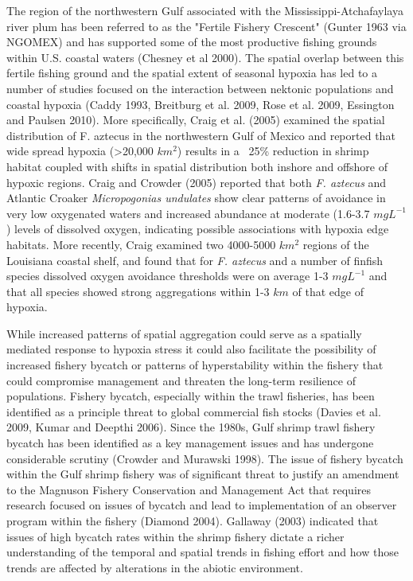 \documentclass[10pt]{article}
\begin{document}
The region of the northwestern Gulf associated with the Mississippi-Atchafaylaya river plum has been referred to as the "Fertile Fishery Crescent" (Gunter 1963 via NGOMEX) and has supported some of the most productive fishing grounds within U.S. coastal waters (Chesney et al 2000).  The spatial overlap between this fertile fishing ground and the spatial extent of seasonal hypoxia has led to a number of studies focused on the interaction between nektonic populations and coastal hypoxia (Caddy 1993, Breitburg et al. 2009, Rose et al. 2009, Essington and Paulsen 2010).  More specifically, Craig et al. (2005) examined the spatial distribution of F. aztecus in the northwestern Gulf of Mexico and reported that wide spread hypoxia (\textgreater 20,000 $ km^{2} $) results in a ~25\% reduction in shrimp habitat coupled with shifts in spatial distribution both inshore and offshore of hypoxic regions.  Craig and Crowder (2005) reported that both \textit{F. aztecus} and Atlantic Croaker \textit{Micropogonias undulates} show clear patterns of avoidance in very low oxygenated waters and increased abundance at moderate (1.6-3.7 $ mg{} L^{-1} $) levels of dissolved oxygen, indicating possible associations with hypoxia edge habitats.  More recently, Craig \cite{craig_aggregation_2012} examined two 4000-5000 $ km^{2} $ regions of the Louisiana coastal shelf, and found that for \textit{F. aztecus} and a number of finfish species dissolved oxygen avoidance thresholds were on average 1-3 $ mg{} L^{-1} $ and that all species showed strong aggregations within 1-3 $ km $ of that edge of hypoxia.  

While increased patterns of spatial aggregation could serve as a spatially mediated response to hypoxia stress it could also facilitate the possibility of increased fishery bycatch or patterns of hyperstability within the fishery that could compromise management and threaten the long-term resilience of populations.  Fishery bycatch, especially within the trawl fisheries, has been identified as a principle threat to global commercial fish stocks (Davies et al. 2009, Kumar and Deepthi 2006).  Since the 1980s, Gulf shrimp trawl fishery bycatch has been identified as a key management issues and has undergone considerable scrutiny (Crowder and Murawski 1998).  The issue of fishery bycatch within the Gulf shrimp fishery was of significant threat to justify an amendment to the Magnuson Fishery Conservation and Management Act that requires research focused on issues of bycatch and lead to implementation of an observer program within the fishery (Diamond 2004).  Gallaway (2003) indicated that issues of high bycatch rates within the shrimp fishery dictate a richer understanding of the temporal and spatial trends in fishing effort and how those trends are affected by alterations in the abiotic environment.  
\end{document}
